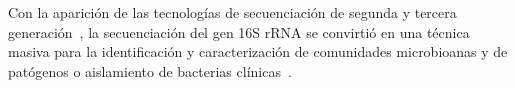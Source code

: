 
Con la aparición de las tecnologías de secuenciación de segunda y tercera generación~\cite{janda200716s,pollock2018madness}, la secuenciación del gen 16S rRNA se convirtió en  una técnica masiva para la identificación y caracterización de comunidades microbioanas y de patógenos o aislamiento de bacterias clínicas~\cite{patel200116s}.












